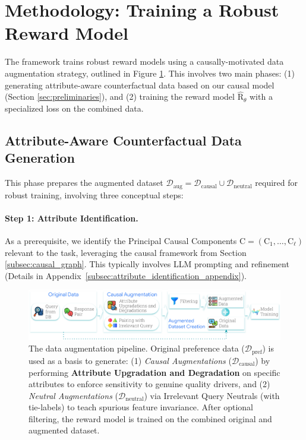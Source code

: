 \section{Methodology: Training a Robust Reward Model}
\label{sec:methodology}

The \carma{} framework trains robust reward models using a causally-motivated data augmentation strategy, outlined in Figure \ref{fig:data_augmentation_pipeline}. This involves two main phases: (1) generating attribute-aware counterfactual data based on our causal model (Section \ref{sec:preliminaries}), and (2) training the reward model $\hat{\mathrm{R}}_\theta$ with a specialized loss on the combined data.


\subsection{Attribute-Aware Counterfactual Data Generation}
\label{subsec:data_generation_phase}

This phase prepares the augmented dataset $\mathcal{D}_{\mathrm{aug}} = \mathcal{D}_{\mathrm{causal}} \cup \mathcal{D}_{\mathrm{neutral}}$ required for robust training, involving three conceptual steps:

\paragraph{Step 1: Attribute Identification.}
As a prerequisite, we identify the Principal Causal Components $\mathrm{C} = (\mathrm{C}_1, \dots, \mathrm{C}_\ell)$ relevant to the task, leveraging the causal framework from Section \ref{subsec:causal_graph}. This typically involves LLM prompting and refinement (Details in Appendix~\ref{subsec:attribute_identification_appendix}).

\begin{figure}[t!]
\centering
\includegraphics[width=\linewidth]{images/DataAugmentationPipeline.pdf} %
\caption{The \carma{} data augmentation pipeline. Original preference data ($\mathcal{D}_{\mathrm{pref}}$) is used as a basis to generate: (1) \textit{Causal Augmentations} ($\mathcal{D}_{\mathrm{causal}}$) by performing \textbf{Attribute Upgradation and Degradation} on specific attributes to enforce sensitivity to genuine quality drivers, and (2) \textit{Neutral Augmentations} ($\mathcal{D}_{\mathrm{neutral}}$) via Irrelevant Query Neutrals (with tie-labels) to teach spurious feature 
invariance. After optional filtering, the reward model is trained on the combined original and augmented dataset.}
\label{fig:data_augmentation_pipeline}
\end{figure}

